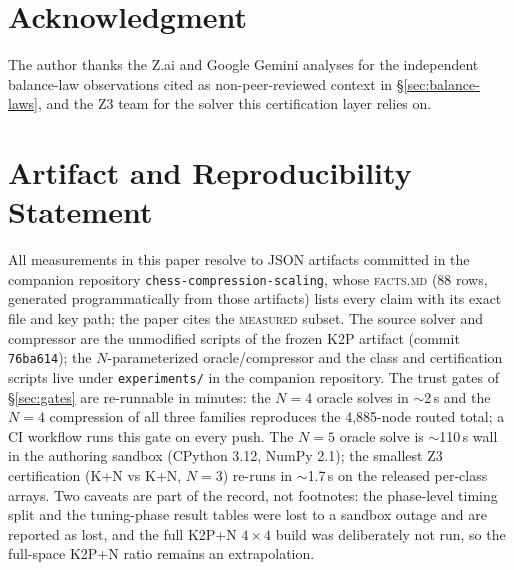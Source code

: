 \documentclass[conference]{IEEEtran}
\begin{document}
\section*{Acknowledgment}
The author thanks the Z.ai and Google Gemini analyses for the independent
balance-law observations cited as non-peer-reviewed context in
\S\ref{sec:balance-laws}, and the Z3 team \cite{demoura2008} for the solver
this certification layer relies on.

\appendices
\section{Artifact and Reproducibility Statement}
All measurements in this paper resolve to JSON artifacts committed in the
companion repository \texttt{chess-compression-scaling}, whose
\textsc{facts.md} (88 rows, generated programmatically from those artifacts)
lists every claim with its exact file and key path; the paper cites the
\textsc{measured} subset. The source solver and compressor are the
unmodified scripts of the frozen K2P artifact \cite{k2p2025} (commit
\texttt{76ba614}); the $N$-parameterized oracle/compressor and the class and
certification scripts live under \texttt{experiments/} in the companion
repository. The trust gates of \S\ref{sec:gates} are re-runnable in
minutes: the $N{=}4$ oracle solves in $\sim$2\,s and the $N{=}4$ compression
of all three families reproduces the 4{,}885-node routed total; a CI workflow
runs this gate on every push. The $N{=}5$ oracle solve is $\sim$110\,s wall
in the authoring sandbox (CPython 3.12, NumPy 2.1); the smallest Z3
certification (K+N vs K+N, $N{=}3$) re-runs in $\sim$1.7\,s on the released
per-class arrays. Two caveats are part of the record, not footnotes: the
phase-level timing split and the tuning-phase result tables were lost to a
sandbox outage and are reported as lost, and the full K2P+N $4\times4$ build
was deliberately not run, so the full-space K2P+N ratio remains an
extrapolation.



\end{document}
